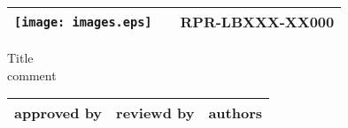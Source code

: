 \documentclass[11pt]{jarticle}
\begin{document}
\begin{tabular}{ |p{50mm}|p{50mm}|p{50mm}| } \hline
\texttt{[image: images.eps]} & & RPR-LBXXX-XX000  \rule[0mm]{0mm}{20mm} \\ \hline
\end{tabular}


\vspace*{60mm}
\begin{center}

\LARGE
Title \\
comment

\end{center}
\vspace*{70mm}


\begin{tabular}{ |p{50mm}|p{50mm}|p{50mm}| } \hline
approved by & reviewd by  & authors \rule[-25mm]{0mm}{30mm}  \\ \hline
\end{tabular}

\clearpage
\end{document}
